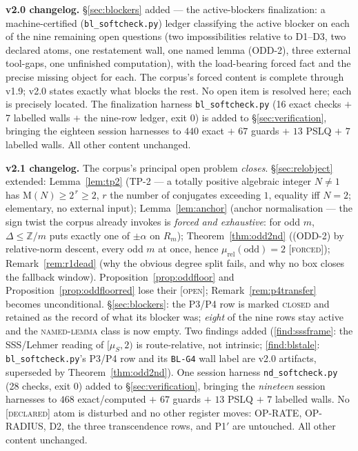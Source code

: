 \documentclass[11pt]{article}
\newcommand{\tagF}{\textcolor{cF}{\textsc{[forced]}}}
\newcommand{\tagD}{\textcolor{cD}{\textsc{[declared]}}}
\newcommand{\tagO}{\textcolor{cO}{\textsc{[open]}}}
\newcommand{\hx}[1]{\textcolor{cC}{\footnotesize\texttt{#1}}}
\newcommand{\Z}{\mathbb{Z}}
\newcommand{\M}{\mathrm{M}}
\theoremstyle{plain}
\theoremstyle{definition}
\theoremstyle{remark}
\begin{document}
\smallskip\noindent
\textbf{v2.0 changelog.} \S\ref{sec:blockers} added --- the active-blockers
finalization: a machine-certified (\texttt{bl\_softcheck.py}) ledger classifying
the active blocker on each of the nine remaining open questions (two impossibilities
relative to D1--D3, two declared atoms, one restatement wall, one named lemma
(ODD-2), three external tool-gaps, one unfinished computation), with the
load-bearing forced fact and the precise missing object for each. The corpus's
forced content is complete through v1.9; v2.0 states exactly what blocks the rest.
No open item is resolved here; each is precisely located. The finalization harness
\texttt{bl\_softcheck.py} (16 exact checks $+$ 7 labelled walls $+$ the nine-row
ledger, exit 0) is added to \S\ref{sec:verification}, bringing the eighteen session
harnesses to $440$ exact $+$ $67$ guards $+$ $13$ PSLQ $+$ $7$ labelled walls. All
other content unchanged.

\smallskip\noindent
\textbf{v2.1 changelog.} The corpus's principal open problem \emph{closes}.
\S\ref{sec:relobject} extended: Lemma~\ref{lem:tp2} (TP-2 --- a totally positive
algebraic integer $N\neq1$ has $\M(N)\ge2^{\,r}\ge2$, $r$ the number of
conjugates exceeding $1$, equality iff $N=2$; elementary, no external input);
Lemma~\ref{lem:anchor} (anchor normalisation --- the sign twist the corpus
already invokes is \emph{forced and exhaustive}: for odd $m$, $\Delta\le\Z/m$
puts exactly one of $\pm\alpha$ on $R_m$); Theorem~\ref{thm:odd2nd} ((ODD-2) by
relative-norm descent, every odd $m$ at once, hence
$\mu_{\mathrm{rel}}(\text{odd})=2$ \tagF{}); Remark~\ref{rem:r1dead} (why the
obvious degree split fails, and why no box closes the fallback window).
Proposition~\ref{prop:oddfloor} and Proposition~\ref{prop:oddfloorred} lose
their \tagO{}; Remark~\ref{rem:p4transfer} becomes unconditional.
\S\ref{sec:blockers}: the P3/P4 row is marked \textsc{closed} and retained as
the record of what its blocker was; \emph{eight} of the nine rows stay active
and the \textsc{named-lemma} class is now empty. Two findings added
(\ref{find:sssframe}: the SSS/Lehmer reading of $[\mu_S,2)$ is route-relative,
not intrinsic; \ref{find:blstale}: \texttt{bl\_softcheck.py}'s P3/P4 row and its
\hx{BL-G4} wall label are v2.0 artifacts, superseded by Theorem~\ref{thm:odd2nd}). One
session harness \texttt{nd\_softcheck.py} (28 checks, exit 0) added to
\S\ref{sec:verification}, bringing the \emph{nineteen} session harnesses to
$468$ exact/computed $+$ $67$ guards $+$ $13$ PSLQ $+$ $7$ labelled walls. No
\tagD{} atom is disturbed and no other register moves: OP-RATE, OP-RADIUS, D2,
the three transcendence rows, and P1$'$ are untouched. All other content
unchanged.
\end{document}
